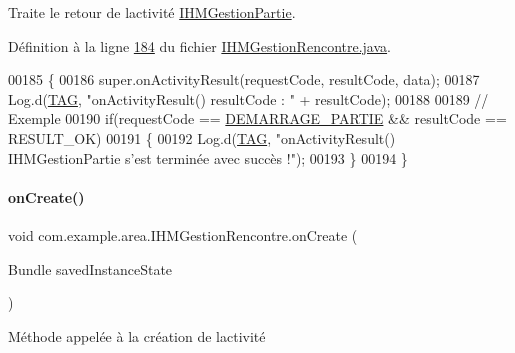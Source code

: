 Traite le retour de l\textquotesingle{}activité \hyperlink{classcom_1_1example_1_1area_1_1_i_h_m_gestion_partie}{I\+H\+M\+Gestion\+Partie}. 



Définition à la ligne \hyperlink{_i_h_m_gestion_rencontre_8java_source_l00184}{184} du fichier \hyperlink{_i_h_m_gestion_rencontre_8java_source}{I\+H\+M\+Gestion\+Rencontre.\+java}.


\begin{DoxyCode}
00185     \{
00186         super.onActivityResult(requestCode, resultCode, data);
00187         Log.d(\hyperlink{classcom_1_1example_1_1area_1_1_i_h_m_gestion_rencontre_a0ac4d9152d48619cd697c8c69166219f}{TAG}, \textcolor{stringliteral}{"onActivityResult() resultCode : "} + resultCode);
00188 
00189         \textcolor{comment}{// Exemple}
00190         \textcolor{keywordflow}{if}(requestCode == \hyperlink{classcom_1_1example_1_1area_1_1_i_h_m_gestion_rencontre_a752975e509f051f66f3f06a744807f21}{DEMARRAGE\_PARTIE} && resultCode == RESULT\_OK)
00191         \{
00192             Log.d(\hyperlink{classcom_1_1example_1_1area_1_1_i_h_m_gestion_rencontre_a0ac4d9152d48619cd697c8c69166219f}{TAG}, \textcolor{stringliteral}{"onActivityResult() IHMGestionPartie s'est terminée avec succès !"});
00193         \}
00194     \}
\end{DoxyCode}
\mbox{\label{classcom_1_1example_1_1area_1_1_i_h_m_gestion_rencontre_a233405b574407eda9ba407dd706fef91}} 
\paragraph{\texorpdfstring{on\+Create()}{onCreate()}}
{\footnotesize\ttfamily void com.\+example.\+area.\+I\+H\+M\+Gestion\+Rencontre.\+on\+Create (\begin{DoxyParamCaption}\item[{Bundle}]{saved\+Instance\+State }\end{DoxyParamCaption})\hspace{0.3cm}{\ttfamily [protected]}}



Méthode appelée à la création de l\textquotesingle{}activité 



